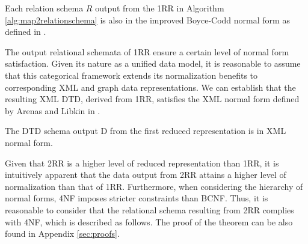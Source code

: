 \begin{theorem} Each relation schema $R$ output from the 1RR in Algorithm  \ref{alg:map2relationschema} is also in the improved  Boyce-Codd normal form as defined in \cite{journals/tods/LingTK81}. \label{theo:improvedBCNF}
\end{theorem}




The output relational schemata of 1RR ensure a certain level of normal form satisfaction. Given its nature as a unified data model, it is reasonable to assume that this categorical framework extends its normalization benefits to corresponding XML and graph data representations. We can establish that the resulting XML DTD, derived from 1RR, satisfies the XML normal form defined by Arenas and Libkin in \cite{journals/tods/ArenasL04}.

\begin{theorem} The DTD schema output D from the first reduced representation is in XML normal form. \label{theo:DTDNormalform}
\end{theorem}


Given that 2RR is a higher level of reduced representation than 1RR, it is intuitively apparent that the data output from 2RR attains a higher level of normalization than that of 1RR. Furthermore, when considering the hierarchy of normal forms,  4NF imposes stricter constraints than BCNF. Thus, it is reasonable to consider that the relational schema resulting from 2RR complies with 4NF, which is described as follows. The proof of the theorem can be also found in Appendix \ref{sec:proofs}.








 


